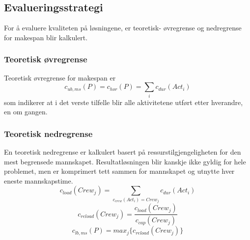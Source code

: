 \subsection{Evalueringsstrategi}
\label{sec:strategy}
For å evaluere kvaliteten på løsningene, er teoretisk- øvregrense og nedregrense for makespan blir kalkulert.

\subsubsection{Teoretisk øvregrense}
\label{sec:teoretiskovre}
Teoretisk øvregrense for makespan er
\begin{equation}
c_{ub,ms}(P) = c_{hor}(P) = \sum_{i} c_{dur}(Act_{i})
\end{equation}
som indikerer at i det verste tilfelle blir alle aktivitetene utført etter hverandre, en om gangen.

\subsubsection{Teoretisk nedregrense}
\label{sec:teoretisknedre}
En teoretisk nedregrense er kalkulert basert på ressurstilgjengeligheten for den mest begrensede mannskapet. Resultatløsningen blir kanskje ikke gyldig for hele problemet, men er komprimert tett sammen for mannskapet og utnytte hver eneste mannskapstime.
\begin{equation}
c_{load}(Crew_{j}) = \sum_{c_{crew}(Act_{i}) = Crew_{j}} c_{dur}(Act_{i})
\end{equation}
\begin{equation}
c_{reload}(Crew_{j}) = \frac{c_{load}(Crew_{j})}{c_{cap}(Crew_{j})}
\end{equation}
\begin{equation}
c_{lb,ms}(P) = max_{j}\{ c_{reload}(Crew_{j}) \}
\end{equation}